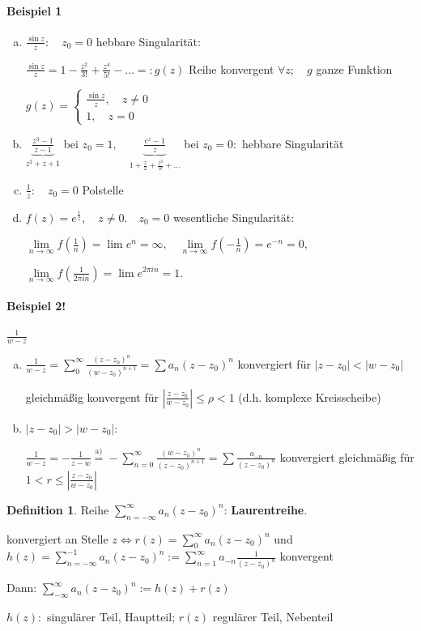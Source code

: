 \documentclass[ngerman,halfparskip]{scrartcl}
\theoremstyle{definition}
\newtheorem{defin}{Definition}[section]
\begin{document}
\paragraph*{Beispiel 1}\begin{enumerate}[a)]
\item $\frac {\sin z}z: \quad z_0 =0$ hebbare Singularität:

$\frac {\sin z}z=1-\frac{z^2}{3!}+\frac{z^4}{5!}-\ldots =:g(z)$ Reihe konvergent $\forall z; \quad g$ ganze Funktion

$g(z)=\begin{cases}
\frac{\sin z}z,\quad z\neq 0 \\
1, \quad z=0
\end{cases}$
\item $\underbrace{\frac{z^3-1}{z-1}}_{z^2+z+1}$ bei $z_0=1, \quad \underbrace{\frac{e^z-1}z}_{1+\frac z2 + \frac {z^2}{3!}+\ldots}$ bei $z_0=0:$ hebbare Singularität

\item $\frac 1z: \quad z_0=0$ Polstelle
\item $f(z)=e^{\frac 1z}, \quad z\neq 0. \quad z_0=0$ wesentliche Singularität: 

$\lim\limits_{n\rightarrow\infty}f(\frac 1n)=\lim e^n=\infty, \quad \lim\limits_{n\rightarrow\infty}f(-\frac 1n)=e^{-n}=0,$

$\lim\limits_{n\rightarrow\infty}f(\frac 1{2\pi i n})=\lim e^{2\pi i n}=1.$
\end{enumerate}

\paragraph*{Beispiel 2!} $\frac 1{w-z}$
\begin{enumerate}[a)]
\item $\frac 1{w-z}=\sum\limits_0^\infty \frac{(z-z_0)^n}{(w-z_0)^{n+1}}=\sum a_n(z-z_0)^n$ konvergiert für $|z-z_0|<|w-z_0|$

gleichmäßig konvergent für $\left|\frac{z-z_0}{w-z_0}\right|\leq \rho<1$ (d.h. komplexe Kreisscheibe)

\item $|z-z_0|>|w-z_0|:$

$\frac 1{w-z}=-\frac 1 {z-w}\overset{\text{a)}}{=}-\sum\limits_{n=0}^\infty \frac {(w-z_0)^n}{(z-z_0)^{n+1}}=\sum \frac{a_{-n}}{(z-z_0)^n}$ konvergiert gleichmäßig für $1<r\leq \left|\frac{z-z_0}{w-z_0}\right|$
\end{enumerate}

\begin{defin}
Reihe $\sum\limits_{n=-\infty}^{\infty}a_n(z-z_0)^n$: \textbf{Laurentreihe}.

konvergiert an Stelle $z \Leftrightarrow r(z)=\sum\limits_0^\infty a_n (z-z_0)^n$ und $h(z)=\sum\limits_{n=-\infty}^{-1} a_n (z-z_0)^n:=\sum\limits_{n=1}^\infty a_{-n}\frac 1{(z-z_0)^n}$ konvergent

Dann: $\sum\limits_{-\infty}^\infty a_n(z-z_0)^n:=h(z)+r(z)$

$h(z):$ singulärer Teil, Hauptteil; $r(z)$ regulärer Teil, Nebenteil
\end{defin}
\end{document}
